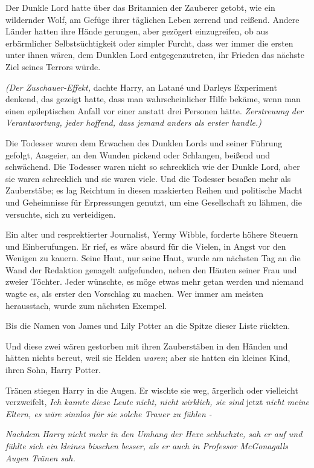 {Der Dunkle Lord hatte über das Britannien der Zauberer getobt, wie ein wildernder Wolf, am Gefüge ihrer täglichen Leben zerrend und reißend. Andere Länder hatten ihre Hände gerungen, aber gezögert einzugreifen, ob aus erbärmlicher Selbstsüchtigkeit oder simpler Furcht, dass wer immer die ersten unter ihnen wären, dem Dunklen Lord entgegenzutreten, ihr Frieden das nächste Ziel seines Terrors würde.

\emph{(Der Zuschauer-Effekt,} dachte Harry, an Latané und Darleys Experiment denkend, das gezeigt hatte, dass man wahrscheinlicher Hilfe bekäme, wenn man einen epileptischen Anfall vor einer anstatt drei Personen hätte. \emph{Zerstreuung der Verantwortung, jeder hoffend, dass jemand anders als erster handle.)}

Die Todesser waren dem Erwachen des Dunklen Lords und seiner Führung gefolgt, Aasgeier, an den Wunden pickend oder Schlangen, beißend und schwächend. Die Todesser waren nicht so schrecklich wie der Dunkle Lord, aber sie waren schrecklich und sie waren viele. Und die Todesser besaßen mehr als Zauberstäbe; es lag Reichtum in diesen maskierten Reihen und politische Macht und Geheimnisse für Erpressungen genutzt, um eine Gesellschaft zu lähmen, die versuchte, sich zu verteidigen.

Ein alter und resprektierter Journalist, Yermy Wibble, forderte höhere Steuern und Einberufungen. Er rief, es wäre absurd für die Vielen, in Angst vor den Wenigen zu kauern. Seine Haut, nur seine Haut, wurde am nächsten Tag an die Wand der Redaktion genagelt aufgefunden, neben den Häuten seiner Frau und zweier Töchter. Jeder wünschte, es möge etwas mehr getan werden und niemand wagte es, als erster den Vorschlag zu machen. Wer immer am meisten herausstach, wurde zum nächsten Exempel.

Bis die Namen von James und Lily Potter an die Spitze dieser Liste rückten.

Und diese zwei wären gestorben mit ihren Zauberstäben in den Händen und hätten nichts bereut, weil sie Helden \emph{waren}; aber sie hatten ein kleines Kind, ihren Sohn, Harry Potter.

Tränen stiegen Harry in die Augen. Er wischte sie weg, ärgerlich oder vielleicht verzweifelt, \emph{Ich kannte diese Leute nicht, nicht wirklich, sie sind} jetzt \emph{nicht meine Eltern, es wäre sinnlos für sie solche Trauer zu fühlen -}

\emph{Nachdem Harry nicht mehr in den Umhang der Hexe schluchzte, sah er auf und fühlte sich ein kleines bisschen besser, als er auch in Professor McGonagalls Augen Tränen sah.}

}
